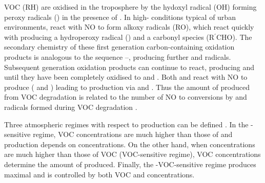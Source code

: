 VOC (RH) are oxidised in the troposphere by the hydoxyl radical (OH) forming peroxy radicals () in the presence of  . 
In high- conditions typical of urban environments,  react with NO  to form alkoxy radicals (RO), which react quickly with   producing a hydroperoxy radical () and a carbonyl species (R$^{\prime}$CHO).
The secondary chemistry of these first generation carbon-containing oxidation products is analogous to the sequence --, producing further  and  radicals.
Subsequent generation oxidation products can continue to react, producing  and  until they have been completely oxidised to  and .
Both  and  react with NO to produce  ( and ) leading to  production via  and . 
Thus the amount of  produced from VOC degradation is related to the number of NO to  conversions by  and  radicals formed during VOC degradation \citep{Atkinson:2000}.
\begin{reactionlist}
\end{reactionlist}

Three atmospheric regimes with respect to  production can be defined \citep{Jenkin:2000}. 
In the -sensitive regime, VOC concentrations are much higher than those of  and  production depends on  concentrations. 
On the other hand, when  concentrations are much higher than those of VOC (VOC-sensitive regime), VOC concentrations determine the amount of  produced.
Finally, the -VOC-sensitive regime produces maximal  and is controlled by both VOC and  concentrations.

